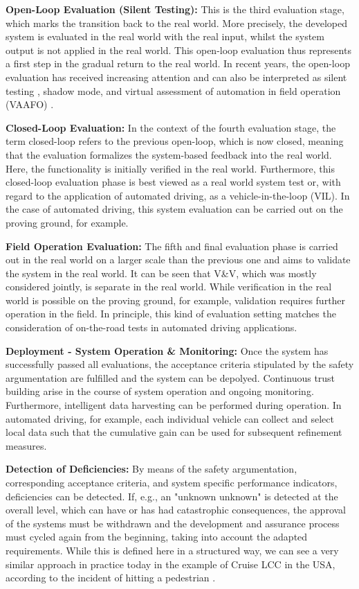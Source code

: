 \textbf{Open-Loop Evaluation (Silent Testing):}  This is the third evaluation stage, which marks the transition back to the real world. More precisely, the developed system is evaluated in the real world with the real input, whilst the system output is not applied in the real world. This open-loop evaluation thus represents a first step in the gradual return to the real world. In recent years, the open-loop evaluation has received increasing attention and can also be interpreted as silent testing \cite{wang2021online}, shadow mode, and virtual assessment of automation in field operation (VAAFO) \cite{wang2020reduction}.

\textbf{Closed-Loop Evaluation:} In the context of the fourth evaluation stage, the term closed-loop refers to the previous open-loop, which is now closed, meaning that the evaluation formalizes the system-based feedback into the real world. Here, the functionality is initially verified in the real world. Furthermore, this closed-loop evaluation phase is best viewed as a real world system test or, with regard to the application of automated driving, as a vehicle-in-the-loop (VIL). In the case of automated driving, this system evaluation can be carried out on the proving ground, for example. 

\textbf{Field Operation Evaluation:} The fifth and final evaluation phase is carried out in the real world on a larger scale than the previous one and aims to validate the system in the real world. It can be seen that V\&V, which was mostly considered jointly, is separate in the real world. While verification in the real world is possible on the proving ground, for example, validation requires further operation in the field. In principle, this kind of evaluation setting matches the consideration of on-the-road tests in automated driving applications.

\textbf{Deployment - System Operation \& Monitoring:} Once the system has successfully passed all evaluations, the acceptance criteria stipulated by the safety argumentation are fulfilled and the system can be depolyed. Continuous trust building arise in the course of system operation and ongoing monitoring. Furthermore, intelligent data harvesting can be performed during operation. In automated driving, for example, each individual vehicle can collect and select local data such that the cumulative gain can be used for subsequent refinement measures. 

\textbf{Detection of Deficiencies:} By means of the safety argumentation, corresponding acceptance criteria, and system specific performance indicators, deficiencies can be detected. If, e.g., an "unknown unknown" is detected at the overall level, which can have or has had catastrophic consequences, the approval of the systems must be withdrawn and the development and assurance process must cycled again from the beginning, taking into account the adapted requirements. While this is defined here in a structured way, we can see a very similar approach in practice today in the example of Cruise LCC in the USA, according to the incident of hitting a pedestrian \cite{equipmentrecallreport, NHTSARecall23E, NHTSARecallLetter}.

